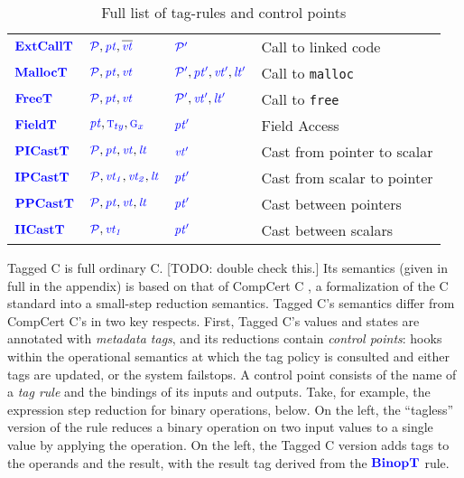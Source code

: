 \documentclass{llncs}
\begin{document}
\begin{table}[t]
\begin{tabular}{|l|l|l|l|}
    \(\extcalltname\)   & \(\extcalltargs\)      & \(\extcalltres\)   & Call to linked code \\
    \(\malloctname\)    & \(\malloctargs\)       & \(\malloctres\)    & Call to {\tt malloc} \\
    \(\freetname\)      & \(\freetargs\)         & \(\freetres\)      & Call to {\tt free} \\
    \(\fieldtname\)     & \(\fieldtargs\)        & \(\fieldtres\)     & Field Access \\
    \(\picasttname\)    & \(\picasttargs\)       & \(\picasttres\)    & Cast from pointer to scalar \\
    \(\ipcasttname\)    & \(\ipcasttargs\)       & \(\ipcasttres\)    & Cast from scalar to pointer \\
    \(\ppcasttname\)    & \(\ppcasttargs\)       & \(\ppcasttres\)    & Cast between pointers \\
    \(\iicasttname\)    & \(\iicasttargs\)       & \(\iicasttres\)    & Cast between scalars \\
    \hline
  \end{tabular}

  \caption{Full list of tag-rules and control points}
  \label{fig:controlpoints}
\end{table}

Tagged C is full ordinary C. [TODO: double check this.]
Its semantics (given in full in the appendix)
is based on that of CompCert C \cite{Leroy09:CompCert},
a formalization of the C standard into a small-step reduction semantics.
Tagged C's semantics differ from CompCert C's in two key respects. First, Tagged C's values
and states are annotated with {\em metadata tags}, and its reductions contain
{\em control points}: hooks within the
operational semantics at which the tag policy is consulted and either tags are updated, or the system
failstops. A control point consists of the name of a {\em tag rule}
and the bindings of its inputs and outputs. Take, for example, the expression step reduction
for binary operations, below. On the left, the ``tagless'' version of the rule reduces a
binary operation on two input values to a single value by applying the operation.
On the left, the Tagged C version adds tags to the operands and the result, with the result tag
derived from the \(\binoptname\) rule.

\begin{minipage}[t]{0.37\textwidth}
  \binopsteptagless
\end{minipage}
\begin{minipage}[t]{0.6\textwidth}
  \binopstep
\end{minipage}
\end{document}
